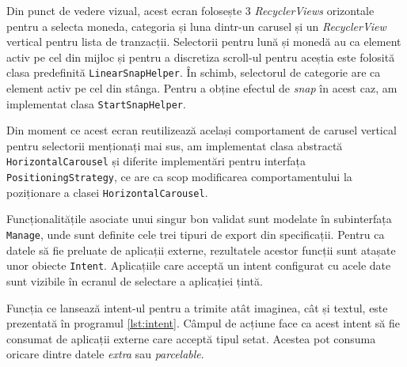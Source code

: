 Din punct de vedere vizual, acest ecran folosește 3 \emph{RecyclerViews} orizontale pentru a selecta moneda, categoria și luna dintr-un carusel și un \emph{RecyclerView} vertical pentru lista de tranzacții. Selectorii pentru lună și monedă au ca element activ pe cel din mijloc și pentru a discretiza scroll-ul pentru aceștia este folosită clasa predefinită \texttt{LinearSnapHelper}. În schimb, selectorul de categorie are ca element activ pe cel din stânga. Pentru a obține efectul de \emph{snap} în acest caz, am implementat clasa \texttt{StartSnapHelper}.

Din moment ce acest ecran reutilizează același comportament de carusel vertical pentru selectorii menționați mai sus, am implementat clasa abstractă \texttt{HorizontalCarousel} și diferite implementări pentru interfața \texttt{PositioningStrategy}, ce are ca scop modificarea comportamentului la poziționare a clasei \texttt{HorizontalCarousel}.

Funcționalitățile asociate unui singur bon validat sunt modelate în subinterfața \texttt{Manage}, unde sunt definite cele trei tipuri de export din specificații. Pentru ca datele să fie preluate de aplicații externe, rezultatele acestor funcții sunt atașate unor obiecte \texttt{Intent}. Aplicațiile care acceptă un intent configurat cu acele date sunt vizibile în ecranul de selectare a aplicației țintă. 

Funcția ce lansează intent-ul pentru a trimite atât imaginea, cât și textul, este prezentată în programul \ref{lst:intent}. Câmpul de acțiune face ca acest intent să fie consumat de aplicații externe care acceptă tipul setat. Acestea pot consuma oricare dintre datele \emph{extra} sau \emph{parcelable}.



